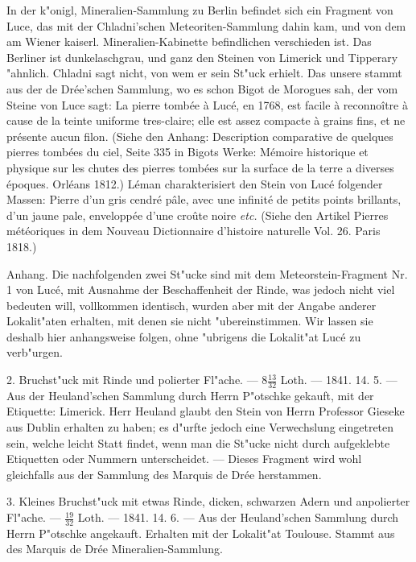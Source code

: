 \documentclass[a4paper, 11pt, oneside, polutonikogreek, german]{article}
\begin{document}
{\footnotesize In der k"onigl, Mineralien-Sammlung zu Berlin befindet sich ein Fragment von Luce, das mit der Chladni'schen Meteoriten-Sammlung dahin kam, und von dem am Wiener kaiserl. Mineralien-Kabinette befindlichen verschieden ist. Das Berliner ist dunkelaschgrau, und ganz den Steinen von Limerick und Tipperary "ahnlich. Chladni sagt nicht, von wem er sein St"uck erhielt. Das unsere stammt aus der de Drée'schen Sammlung, wo es schon Bigot de Morogues sah, der vom Steine von Luce sagt: La pierre tombée à Lucé, en 1768, est facile à reconnoître à cause de la teinte uniforme tres-claire; elle est assez compacte à grains fins, et ne présente aucun filon. (Siehe den Anhang: Description comparative de quelques pierres tombées du ciel, Seite 335 in Bigots Werke: Mémoire historique et physique sur les chutes des pierres tombées sur la surface de la terre a diverses époques. Orléans 1812.) Léman charakterisiert den Stein von Lucé folgender Massen: Pierre d’un gris cendré pâle, avec une infinité de petits points brillants, d'un jaune pale, enveloppée d'une croûte noire \emph{etc.} (Siehe den Artikel Pierres météoriques in dem Nouveau Dictionnaire d'histoire naturelle Vol. 26. Paris 1818.)}

\setlength{\leftskip}{0pt}
\setlength{\parindent}{20pt}

Anhang. Die nachfolgenden zwei St"ucke sind mit dem Meteorstein-Fragment Nr. 1 von Lucé, mit Ausnahme der Beschaffenheit der Rinde, was jedoch nicht viel bedeuten will, vollkommen identisch, wurden aber mit der Angabe anderer Lokalit"aten erhalten, mit denen sie nicht "ubereinstimmen. Wir lassen sie deshalb hier anhangsweise folgen, ohne "ubrigens die Lokalit"at Lucé zu verb"urgen.

2. Bruchst"uck mit Rinde und polierter Fl"ache. --- $8\frac{13}{32}$ Loth. --- 1841. 14. 5. --- Aus der Heuland'schen Sammlung durch Herrn P"otschke gekauft, mit der Etiquette: Limerick. Herr Heuland glaubt den Stein von Herrn Professor Gieseke aus Dublin erhalten zu haben; es d"urfte jedoch eine Verwechslung eingetreten sein, welche leicht Statt findet, wenn man die St"ucke nicht durch aufgeklebte Etiquetten oder Nummern unterscheidet. --- Dieses Fragment wird wohl gleichfalls aus der Sammlung des Marquis de Drée herstammen.

3. Kleines Bruchst"uck mit etwas Rinde, dicken, schwarzen Adern und anpolierter Fl"ache. --- $\frac{19}{32}$ Loth. --- 1841. 14. 6. --- Aus der Heuland'schen Sammlung durch Herrn P"otschke angekauft. Erhalten mit der Lokalit"at Toulouse. Stammt aus des Marquis de Drée Mineralien-Sammlung.
\end{document}

